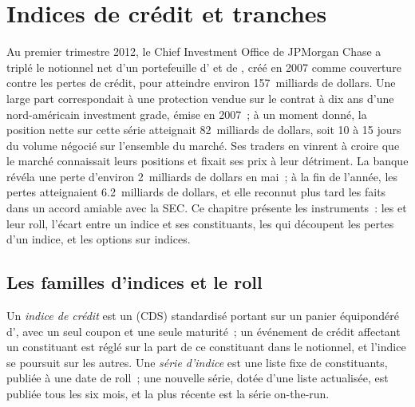 \chapter{Indices de crédit et tranches}\label{ch:m2:credit-indices-and-tranches}

Au premier trimestre 2012, le Chief Investment Office de JPMorgan Chase a triplé
le notionnel net d'un portefeuille d' et de , créé en 2007 comme
couverture contre les pertes de crédit, pour atteindre environ 157~milliards de dollars. Une large part correspondait à une protection
vendue sur le contrat à dix ans d'une  nord-américain investment grade,
émise en 2007~; à un moment donné, la position nette sur cette série atteignait
82~milliards de dollars, soit 10 à 15 jours du volume négocié sur l'ensemble du marché.
Ses traders en vinrent à croire que le marché connaissait leurs positions et fixait ses prix
à leur détriment. La banque révéla une perte d'environ 2~milliards de dollars en mai~; à la fin de
l'année, les pertes atteignaient 6.2~milliards de dollars, et elle reconnut plus tard les faits dans un
accord amiable avec la SEC. Ce chapitre présente les instruments~: les  et
leur roll, l'écart entre un indice et ses constituants, les  qui découpent les
pertes d'un indice, et les options sur indices.

\section{Les familles d'indices et le roll}

\begin{definition}\label{def:m2:credit-indices-and-tranches:index}
Un \emph{indice de crédit} est un  (CDS) standardisé portant sur un
panier équipondéré d', avec un seul coupon et une seule maturité~; un
événement de crédit affectant un constituant est réglé sur la part de ce constituant dans le notionnel,
et l'indice se poursuit sur les autres. Une \emph{série d'indice} est
une liste fixe de constituants, publiée à une date de roll~; une nouvelle série, dotée d'une
liste actualisée, est publiée tous les six mois, et la plus récente est la série on-the-run.
\end{definition}

